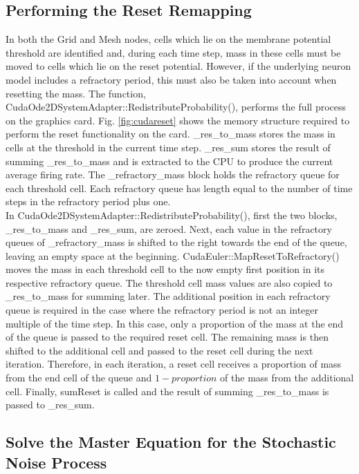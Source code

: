\documentclass[utf8]{frontiers_suppmat} %
\begin{document}
\subsection{Performing the Reset Remapping}

In both the Grid and Mesh nodes, cells which lie on the membrane potential threshold are identified and, during each time step, mass in these cells must be moved to cells which lie on the reset potential. However, if the underlying neuron model includes a refractory period, this must also be taken into account when resetting the mass. The function, CudaOde2DSystemAdapter::RedistributeProbability(), performs the full process on the graphics card. Fig. \ref{fig:cudareset} shows the memory structure required to perform the reset functionality on the card. \_res\_to\_mass stores the mass in cells at the threshold in the current time step. \_res\_sum stores the result of summing \_res\_to\_mass and is extracted to the CPU to produce the current average firing rate. The \_refractory\_mass block holds the refractory queue for each threshold cell. Each refractory queue has length equal to the number of time steps in the refractory period plus one. \\

In CudaOde2DSystemAdapter::RedistributeProbability(), first the two blocks, \_res\_to\_mass and \_res\_sum, are zeroed. Next, each value in the refractory queues of \_refractory\_mass is shifted to the right towards the end of the queue, leaving an empty space at the beginning. CudaEuler::MapResetToRefractory() moves the mass in each threshold cell to the now empty first position in its respective refractory queue. The threshold cell mass values are also copied to \_res\_to\_mass for summing later. The additional position in each refractory queue is required in the case where the refractory period is not an integer multiple of the time step. In this case, only a proportion of the mass at the end of the queue is passed to the required reset cell. The remaining mass is then shifted to the additional cell and passed to the reset cell during the next iteration. Therefore, in each iteration, a reset cell receives a proportion of mass from the end cell of the queue and $1 - proportion$ of the mass from the additional cell. Finally, sumReset is called and the result of summing \_res\_to\_mass is passed to \_res\_sum.\\

\subsection{Solve the Master Equation for the Stochastic Noise Process}
\end{document}
